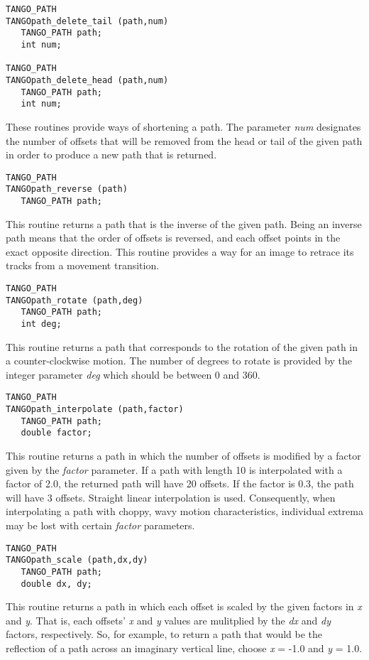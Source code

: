 \vspace{1em}
\begin{verbatim}
TANGO_PATH
TANGOpath_delete_tail (path,num) 
   TANGO_PATH path;
   int num;

TANGO_PATH
TANGOpath_delete_head (path,num) 
   TANGO_PATH path;
   int num;
\end{verbatim}
These routines provide ways of shortening a path.  The parameter {\em num}
designates the number of offsets that will be removed from the head or tail of
the given path in order to produce a new path that is returned.

\vspace{1em}
\begin{verbatim}
TANGO_PATH
TANGOpath_reverse (path) 
   TANGO_PATH path;
\end{verbatim}
This routine returns a path that is the inverse of the given path.
Being an inverse path means that the order of offsets is reversed, and
each offset points in the exact opposite direction.  This routine
provides a way for an image to retrace its tracks from a movement transition.

\vspace{1em}
\begin{verbatim}
TANGO_PATH
TANGOpath_rotate (path,deg) 
   TANGO_PATH path;
   int deg;
\end{verbatim}
This routine returns a path that corresponds to the rotation of the given path
in a counter-clockwise motion.  The number of degrees to rotate is provided by
the integer parameter {\em deg} which should be between 0 and 360.

\vspace{1em}
\begin{verbatim}
TANGO_PATH
TANGOpath_interpolate (path,factor) 
   TANGO_PATH path;
   double factor;
\end{verbatim}
This routine returns a path in which the number of offsets is modified by a
factor given by the {\em factor} parameter.  If a path with length 10 is
interpolated with a factor of 2.0, the returned path will have 20 offsets.  If
the factor is 0.3, the path will have 3 offsets.  Straight linear
interpolation is used.  Consequently, when interpolating a path with choppy,
wavy motion characteristics, individual extrema may be lost with certain
{\em factor} parameters.

\vspace{1em}
\begin{verbatim}
TANGO_PATH
TANGOpath_scale (path,dx,dy) 
   TANGO_PATH path;
   double dx, dy;
\end{verbatim}
This routine returns a path in which each offset is scaled by the given
factors in {\em x} and {\em y}.  That is, each offsets' {\em x}
and {\em y}
values are mulitplied by the {\em dx} and {\em dy} factors, respectively.  So,
for example, to return a path that would be the reflection of a path across an
imaginary vertical line, choose {\em x} = -1.0 and {\em y} = 1.0.

